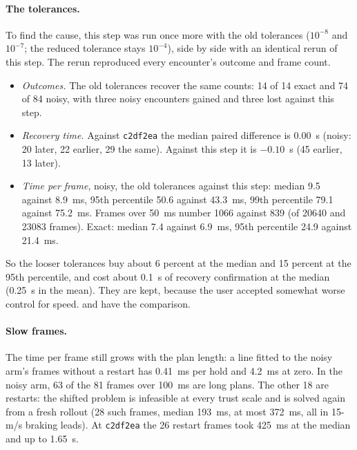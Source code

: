 \documentclass[11pt]{article}
\begin{document}
\paragraph{The tolerances.}
To find the cause, this step was run once more with the old tolerances
($10^{-8}$ and $10^{-7}$; the reduced tolerance stays $10^{-4}$), side by
side with an identical rerun of this step. The rerun reproduced every
encounter's outcome and frame count.
\begin{itemize}
\item \emph{Outcomes.} The old tolerances recover the same counts: 14 of 14
  exact and 74 of 84 noisy, with three noisy encounters gained and three
  lost against this step.
\item \emph{Recovery time.} Against \texttt{c2df2ea} the median paired
  difference is 0.00~s (noisy: 20 later, 22 earlier, 29 the same). Against
  this step it is $-0.10$~s (45 earlier, 13 later).
\item \emph{Time per frame}, noisy, the old tolerances against this step:
  median 9.5 against 8.9~ms, 95th percentile 50.6 against 43.3~ms, 99th
  percentile 79.1 against 75.2~ms. Frames over 50~ms number 1066 against
  839 (of 20640 and 23083 frames). Exact: median 7.4 against 6.9~ms, 95th
  percentile 24.9 against 21.4~ms.
\end{itemize}
So the looser tolerances buy about 6 percent at the median and 15 percent
at the 95th percentile, and cost about 0.1~s of recovery confirmation at the
median (0.25~s in the mean). They are kept, because the user accepted
somewhat worse control for speed.  and 
have the comparison.

\paragraph{Slow frames.}
The time per frame still grows with the plan length: a line fitted to the
noisy arm's frames without a restart has 0.41~ms per hold and 4.2~ms at
zero. In the noisy arm, 63 of the 81 frames over 100~ms are long plans.
The other 18 are restarts: the shifted problem is infeasible at every trust
scale and is solved again from a fresh rollout (28 such frames, median
193~ms, at most 372~ms, all in 15-m/s braking leads). At \texttt{c2df2ea}
the 26 restart frames took 425~ms at the median and up to 1.65~s.
\end{document}
